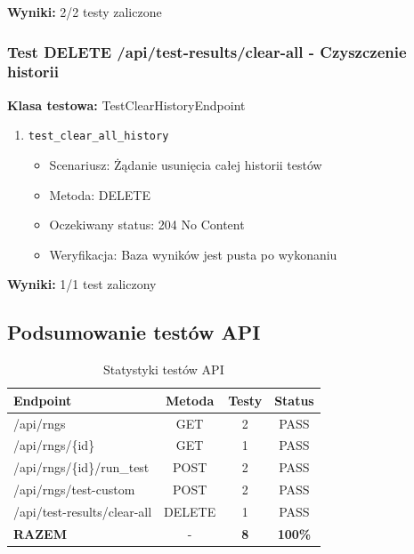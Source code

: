 \documentclass[12pt,a4paper]{article}
\begin{document}
\textbf{Wyniki:} 2/2 testy zaliczone

\subsubsection{Test DELETE /api/test-results/clear-all - Czyszczenie historii}

\textbf{Klasa testowa:} TestClearHistoryEndpoint

\begin{enumerate}
    \item \texttt{test\_clear\_all\_history}
    \begin{itemize}
        \item Scenariusz: Żądanie usunięcia całej historii testów
        \item Metoda: DELETE
        \item Oczekiwany status: 204 No Content
        \item Weryfikacja: Baza wyników jest pusta po wykonaniu
    \end{itemize}
\end{enumerate}

\textbf{Wyniki:} 1/1 test zaliczony

\subsection{Podsumowanie testów API}

\begin{table}[H]
\centering
\caption{Statystyki testów API}
\begin{tabular}{|l|c|c|c|}
\hline
\textbf{Endpoint} & \textbf{Metoda} & \textbf{Testy} & \textbf{Status} \\
\hline
/api/rngs & GET & 2 & \textcolor{passgreen}{PASS} \\
\hline
/api/rngs/\{id\} & GET & 1 & \textcolor{passgreen}{PASS} \\
\hline
/api/rngs/\{id\}/run\_test & POST & 2 & \textcolor{passgreen}{PASS} \\
\hline
/api/rngs/test-custom & POST & 2 & \textcolor{passgreen}{PASS} \\
\hline
/api/test-results/clear-all & DELETE & 1 & \textcolor{passgreen}{PASS} \\
\hline
\hline
\textbf{RAZEM} & - & \textbf{8} & \textcolor{passgreen}{\textbf{100\%}} \\
\hline
\end{tabular}
\end{table}
\end{document}
